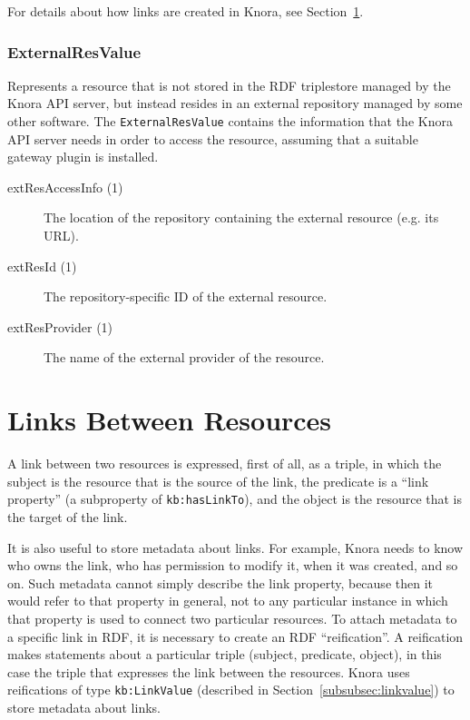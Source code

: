 \documentclass[12pt, a4paper]{article}
\begin{document}
For details about how links are created in Knora, see Section~\ref{sec:links}.

\subsubsection{ExternalResValue}

Represents a resource that is not stored in the RDF triplestore managed by the Knora API server, but instead resides in an external repository managed by some other software. The \texttt{ExternalResValue} contains the information that the Knora API server needs in order to access the resource, assuming that a suitable gateway plugin is installed. 

\begin{description}
	\item[extResAccessInfo (1)] The location of the repository containing the external resource (e.g. its URL).
	\item[extResId (1)] The repository-specific ID of the external resource.
	\item[extResProvider (1)] The name of the external provider of the resource.
\end{description}

\section{Links Between Resources}

\label{sec:links}

A link between two resources is expressed, first of all, as a triple, in which the subject is the resource that is the source of the link, the predicate is a \enquote{link property} (a subproperty of \texttt{kb:hasLinkTo}), and the object is the resource that is the target of the link.

It is also useful to store metadata about links. For example, Knora needs to know who owns the link, who has permission to modify it, when it was created, and so on. Such metadata cannot simply describe the link property, because then it would refer to that property in general, not to any particular instance in which that property is used to connect two particular resources. To attach metadata to a specific link in RDF, it is necessary to create an RDF \enquote{reification}. A reification makes statements about a particular triple (subject, predicate, object), in this case the triple that expresses the link between the resources. Knora uses reifications of type \texttt{kb:LinkValue} (described in Section~\ref{subsubsec:linkvalue}) to store metadata about links.
\end{document}
